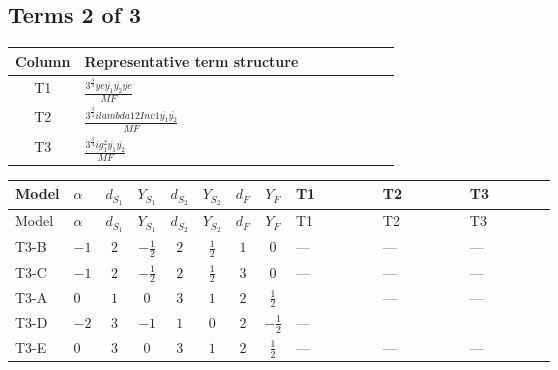 \documentclass[8pt]{article}
\begin{document}
\begin{landscape}
\subsection*{Terms 2 of 3}
\begin{center}
\begin{tabular}{@{}c >{\raggedright\arraybackslash}p{0.82\linewidth}@{}}
\toprule
Column & Representative term structure \\
\midrule
T1 & \(\displaystyle \frac{3^{\frac{3}{4}} ye \overline{y_{1}} \overline{y_{2}} \overline{ye}}{MF}\) \\
\midrule
T2 & \(\displaystyle \frac{3^{\frac{3}{4}} i lambda12Inv1 \overline{y_{1}} \overline{y_{2}}}{MF}\) \\
\midrule
T3 & \(\displaystyle \frac{3^{\frac{3}{4}} i g_{1}^{2} \overline{y_{1}} \overline{y_{2}}}{MF}\) \\
\midrule
\bottomrule
\end{tabular}
\end{center}
\smallskip
\tiny
\begin{longtable}{@{}llcccccc >{\raggedright\arraybackslash}p{0.21\linewidth} >{\raggedright\arraybackslash}p{0.21\linewidth} >{\raggedright\arraybackslash}p{0.21\linewidth}@{}}
\toprule
Model & $\alpha$ & $d_{S_1}$ & $Y_{S_1}$ & $d_{S_2}$ & $Y_{S_2}$ & $d_F$ & $Y_F$ & T1 & T2 & T3 \\
\midrule
\endfirsthead
\toprule
Model & $\alpha$ & $d_{S_1}$ & $Y_{S_1}$ & $d_{S_2}$ & $Y_{S_2}$ & $d_F$ & $Y_F$ & T1 & T2 & T3 \\
\midrule
\endhead
T3-B & $-1$ & $2$ & $-\frac{1}{2}$ & $2$ & $\frac{1}{2}$ & $1$ & $0$ & --- & --- & --- \\
\midrule
T3-C & $-1$ & $2$ & $-\frac{1}{2}$ & $2$ & $\frac{1}{2}$ & $3$ & $0$ & --- & --- & --- \\
\midrule
T3-A & $0$ & $1$ & $0$ & $3$ & $1$ & $2$ & $\frac{1}{2}$ & \scriptsize\adjustbox{max width=\linewidth}{$\begin{gathered} - \frac{3^{\frac{3}{4}} ye \overline{y_{1}} \overline{y_{2}} \overline{ye}}{12 MF}\end{gathered}$} & --- & --- \\
\midrule
T3-D & $-2$ & $3$ & $-1$ & $1$ & $0$ & $2$ & $-\frac{1}{2}$ & --- & \scriptsize\adjustbox{max width=\linewidth}{$\begin{gathered} \frac{3^{\frac{3}{4}} i lambda12Inv1 \overline{y_{1}} \overline{y_{2}}}{6 MF}\end{gathered}$} & \scriptsize\adjustbox{max width=\linewidth}{$\begin{gathered} \frac{3^{\frac{3}{4}} i g_{1}^{2} \overline{y_{1}} \overline{y_{2}}}{8 MF}\end{gathered}$} \\
\midrule
T3-E & $0$ & $3$ & $0$ & $3$ & $1$ & $2$ & $\frac{1}{2}$ & --- & --- & --- \\
\midrule
\bottomrule
\end{longtable}
\clearpage

\end{landscape}
\end{document}
